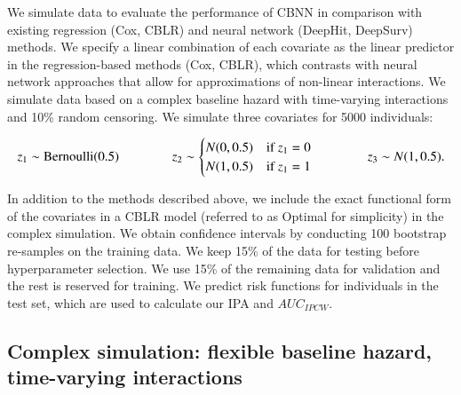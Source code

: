 \documentclass[preprint,12pt]{elsarticle}
\begin{document}
We simulate data to evaluate the performance of CBNN in comparison with existing regression (Cox, CBLR) and neural network (DeepHit, DeepSurv)
methods. We specify a linear combination of each covariate as the linear predictor in the regression-based methods (Cox, CBLR), which contrasts
with neural network approaches that allow for approximations of non-linear interactions. We simulate data based on a complex baseline hazard with time-varying
interactions and 10\% random censoring. We simulate three covariates for 5000 individuals:


\begin{equation*}
\resizebox{\hsize}{!}{$
z_{1} \sim \textrm{Bernoulli}(0.5) \qquad \qquad %
z_{2} \sim \begin{cases}
 N(0,0.5) & \textrm{if } z_{1}=0\\ 
 N(1,0.5) & \textrm{if } z_{1}=1
\end{cases} \qquad \qquad
z_{3} \sim N(1,0.5).$}
\end{equation*}

In addition to the methods described above, we include the exact functional form of the covariates in a CBLR model (referred to as Optimal for simplicity)
in the complex simulation. We obtain confidence intervals by conducting 100 bootstrap re-samples on the training data. We keep 15\% of the data for testing before
hyperparameter selection. We use 15\% of the remaining data for validation and the rest is reserved for training. We predict risk functions for individuals in
the test set, which are used to calculate our IPA and $AUC_{IPCW}$. 





\hypertarget{complex-simulation-flexible-baseline-hazard-time-varying-interactions}{%
\subsection{Complex simulation: flexible baseline hazard, time-varying
interactions}\label{complex-simulation-flexible-baseline-hazard-time-varying-interactions}}
\end{document}
